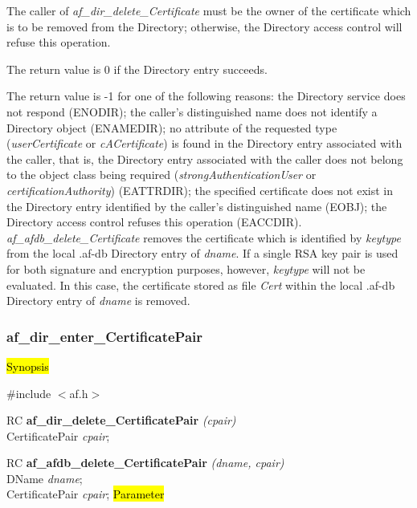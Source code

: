 The caller of {\em af\_dir\_delete\_Certificate} must be the owner of the certificate
which is to be removed from the Directory; otherwise, the Directory access control
will refuse this operation.

The return value is 0 if the Directory entry succeeds.

The return value is -1 for one of the following reasons:
\bi
\m the Directory service does not respond (ENODIR);
\m the caller's distinguished name does not identify a Directory object (ENAMEDIR);
\m no attribute of the requested type ({\em userCertificate} or {\em cACertificate})
is found in the Directory entry associated with the caller, that is, the Directory entry
associated with the caller does not belong to the object class being required
({\em strongAuthenticationUser} or {\em certificationAuthority}) (EATTRDIR);
\m the specified certificate does not exist in the Directory entry 
identified by the caller's distinguished name (EOBJ);
\m the Directory access control refuses this operation (EACCDIR).
\ei
{\em af\_afdb\_delete\_Certificate} removes the certificate which is
identified by {\em keytype} from the 
local .af-db Directory entry of {\em dname}. If a single RSA key pair is used for both signature and encryption purposes, however,
{\em keytype} will not be evaluated. In this case, the certificate stored as file {\em Cert} within the
local .af-db Directory entry of {\em dname} is removed.



\subsubsection{af\_dir\_enter\_CertificatePair}

\hl{Synopsis}

\#include $<$af.h$>$

RC {\bf af\_dir\_delete\_CertificatePair} {\em (cpair)} \\
CertificatePair {\em *cpair};

RC {\bf af\_afdb\_delete\_CertificatePair} {\em (dname, cpair)} \\
DName {\em *dname}; \\
CertificatePair {\em *cpair};
\hl{Parameter}


